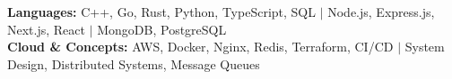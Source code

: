 \begin{itemize}[leftmargin=0.15in, label={}]
  \small{\item{
    \textbf{Languages:} C++, Go, Rust, Python, TypeScript, SQL $|$ Node.js, Express.js, Next.js, React $|$ MongoDB, PostgreSQL \\
    \textbf{Cloud \& Concepts:} AWS, Docker, Nginx, Redis, Terraform, CI/CD $|$ System Design, Distributed Systems, Message Queues
  }}
\end{itemize}
